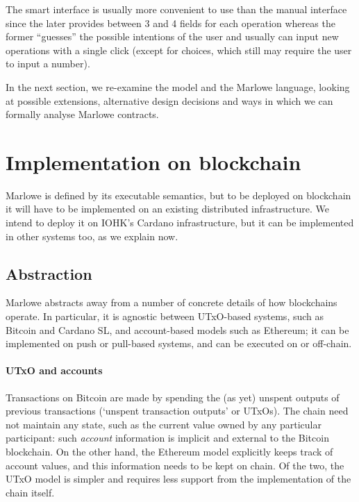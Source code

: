 \documentclass[runningheads]{llncs}
\begin{document}
The smart interface is usually more convenient to use than the manual
interface since the later provides between 3 and 4 fields for each
operation whereas the former ``guesses'' the possible intentions
of the user and usually can input new operations with a single click 
(except for choices, which still may require the user to input a number).


In the next section, we re-examine the model and the Marlowe language, looking at possible extensions, alternative 
design decisions and ways in which we can formally analyse Marlowe contracts.




\section{Implementation on blockchain}
\label{section:towards-implementation}

Marlowe is defined by its executable semantics, but to be deployed on blockchain it will have to be implemented on an existing distributed infrastructure.  We intend to deploy it on IOHK's Cardano infrastructure, but it can be implemented in other systems too, as we explain now.

\subsection{Abstraction}
\label{sec:abstraction}

Marlowe abstracts away from a number of concrete details of how blockchains operate. In particular, it is agnostic between UTxO-based systems, such as Bitcoin and Cardano SL, and account-based models such as Ethereum; it can be implemented on push or pull-based systems, and can be executed on or off-chain. 

\paragraph{UTxO and accounts}

Transactions on Bitcoin are made by spending the (as yet) unspent outputs of 
previous transactions (`unspent transaction outputs' or UTxOs). The chain need not maintain any state, such as the 
current value owned by any particular participant: such \emph{account} information is implicit and external to the 
Bitcoin blockchain. On the other hand, the Ethereum model explicitly keeps track of account values, and  this 
information needs to be kept on chain. Of the two, the UTxO model is simpler and requires less support from the implementation of the chain itself.
\end{document}
